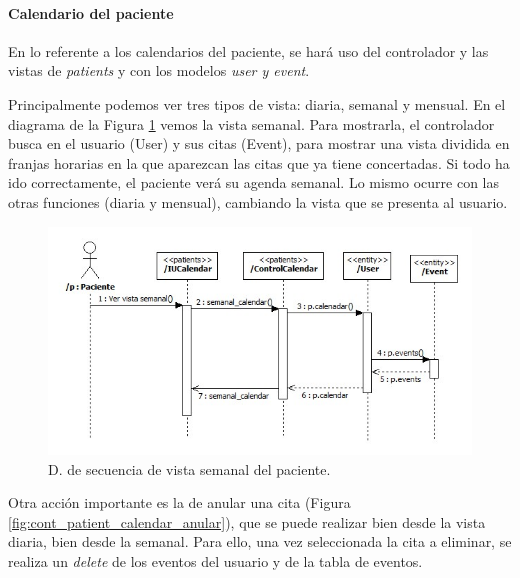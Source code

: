 			
				\paragraph{Calendario del paciente} %
				\label{subp:cont_calendario_paciente}
				
					En lo referente a los calendarios del paciente, se hará uso del controlador y las vistas de \textit{patients} y con los modelos \textit{user y event}.
					
					Principalmente podemos ver tres tipos de vista: diaria, semanal y mensual. En el diagrama de la Figura \ref{fig:cont_patient_calendar} vemos la vista semanal. Para mostrarla, el controlador busca en el usuario (User) y sus citas (Event), para mostrar una vista dividida en franjas horarias en la que aparezcan las citas que ya tiene concertadas. Si todo ha ido correctamente, el paciente verá su agenda semanal. Lo mismo ocurre con las otras funciones (diaria y mensual), cambiando la vista que se presenta al usuario.
					
					\begin{figure}[H]
					  \centering
					    \includegraphics[width=13.5cm]{img/jpg/secuencia/9_patient_calendar_semanal.jpg}
					  \caption{D. de secuencia de vista semanal del paciente.}
					  \label{fig:cont_patient_calendar}
					\end{figure}
					
					Otra acción importante es la de anular una cita (Figura \ref{fig:cont_patient_calendar_anular}), que se puede realizar bien desde la vista diaria, bien desde la semanal. Para ello, una vez seleccionada la cita a eliminar, se realiza un \textit{delete} de los eventos del usuario y de la tabla de eventos.
					
